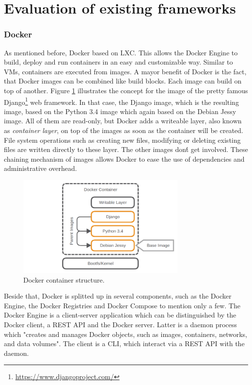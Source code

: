 \section{Evaluation of existing frameworks}

\subsubsection{Docker}
As mentioned before, Docker based on \ac{LXC}.
This allows the Docker Engine to build, deploy and run containers in an easy and customizable way.
Similar to \acp{VM}, containers are executed from images.
A mayor benefit of Docker is the fact, that Docker images can be combined like build blocks.
Each image can build on top of another.
Figure \ref{fig:docker_container_structure} illustrates the concept for the image of the pretty famous Django\footnote{\url{https://www.djangoproject.com/}} web framework.
In that case, the Django image, which is the resulting image, based on the Python 3.4 image which again based on the Debian Jessy image.
All of them are read-only, but Docker adds a writeable layer, also known as \textit{container layer}, on top of the images as soon as the container will be created.
File system operations such as creating new files, modifying or deleting existing files are written directly to these layer.\cite[cf.]{dockerImages}
The other images don\'t get involved.
These chaining mechanism of images allows Docker to ease the use of dependencies and administrative overhead.

\begin{figure}[H]
    \centering
    \includegraphics[width=0.75\textwidth]{resources/images/docker_container_structure.png}
    \caption[Docker container structure]{Docker container structure.}
    \label{fig:docker_container_structure}
\end{figure}

Beside that, Docker is splitted up in several components, such as the Docker Engine, the Docker Registries and Docker Compose to mention only a few.
The Docker Engine is a client-server application which can be distinguished by the Docker client, a \ac{REST} \ac{API} and the Docker server.
Latter is a daemon process which "creates and manages Docker objects, such as images, containers, networks, and data volumes"\cite{dockerEngine}.
The client is a \ac{CLI}, which interact via a \ac{REST} \ac{API} with the daemon.\cite[cf.]{dockerEngine}

